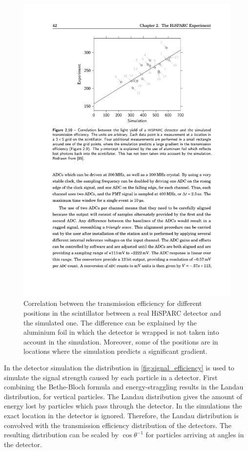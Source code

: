 \begin{figure}
    \centering
    \includegraphics{plots/station/scintilator_transmission_compared}
    \caption{Correlation between the transmission efficiency for different positions in the scintillator between a real HiSPARC detector and the simulated one. The difference can be explained by the aluminium foil in which the detector is wrapped is not taken into account in the simulation. Moreover, some of the positions are in locations where the simulation predicts a significant gradient.}
    \label{fig:scintilator_transmission_compared}
\end{figure}

In the detector simulation the distribution in \cref{fig:signal_efficiency} is used to simulate the signal strength caused by each particle in a detector. First combining the Bethe-Bloch formula and energy-straggling results in the Landau distribution, for vertical particles. The Landau distribution gives the amount of energy lost by particles which pass through the detector. In the simulations the exact location in the detector is ignored. Therefore, the Landau distribution is convolved with the transmission efficiency distribution of the detectors. The resulting distribution can be scaled by $\cos{\theta}^{-1}$ for particles arriving at angles in the detector.

